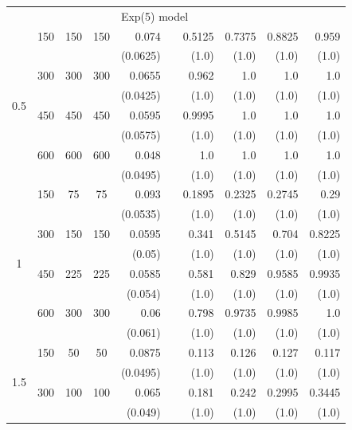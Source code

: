 \begin{table}[htbp]
\begin{tabular}{ccccrrrrrr}
        &   &     &     & \multicolumn{6}{l}{Exp(5) model} \\
        \multirow{8}{*}{0.5}
            & 150 & 150 & 150 & 0.074 &       & 0.5125 & 0.7375 & 0.8825 & 0.959 \\
            &     &     &     & (0.0625) &       & (1.0) & (1.0) & (1.0) & (1.0) \\
            & 300 & 300 & 300 & 0.0655 &       & 0.962 & 1.0 & 1.0 & 1.0 \\
            &     &     &     & (0.0425) &       & (1.0) & (1.0) & (1.0) & (1.0) \\
            & 450 & 450 & 450 & 0.0595 &       & 0.9995 & 1.0 & 1.0 & 1.0 \\
            &     &     &     & (0.0575) &       & (1.0) & (1.0) & (1.0) & (1.0) \\
            & 600 & 600 & 600 & 0.048 &       & 1.0 & 1.0 & 1.0 & 1.0 \\
            &     &     &     & (0.0495) &       & (1.0) & (1.0) & (1.0) & (1.0) \\
            \midrule
        \multirow{8}{*}{1}
            & 150 & 75 & 75 & 0.093 &       & 0.1895 & 0.2325 & 0.2745 & 0.29 \\
            &     &     &     & (0.0535) &       & (1.0) & (1.0) & (1.0) & (1.0) \\
            & 300 & 150 & 150 & 0.0595 &       & 0.341 & 0.5145 & 0.704 & 0.8225 \\
            &     &     &     & (0.05) &       & (1.0) & (1.0) & (1.0) & (1.0) \\
            & 450 & 225 & 225 & 0.0585 &       & 0.581 & 0.829 & 0.9585 & 0.9935 \\
            &     &     &     & (0.054) &       & (1.0) & (1.0) & (1.0) & (1.0) \\
            & 600 & 300 & 300 & 0.06 &       & 0.798 & 0.9735 & 0.9985 & 1.0 \\
            &     &     &     & (0.061) &       & (1.0) & (1.0) & (1.0) & (1.0) \\
            \midrule
        \multirow{8}{*}{1.5}
            & 150 & 50 & 50 & 0.0875 &       & 0.113 & 0.126 & 0.127 & 0.117 \\
            &     &     &     & (0.0495) &       & (1.0) & (1.0) & (1.0) & (1.0) \\
            & 300 & 100 & 100 & 0.065 &       & 0.181 & 0.242 & 0.2995 & 0.3445 \\
            &     &     &     & (0.049) &       & (1.0) & (1.0) & (1.0) & (1.0) \\

\end{tabular}
\end{table}
